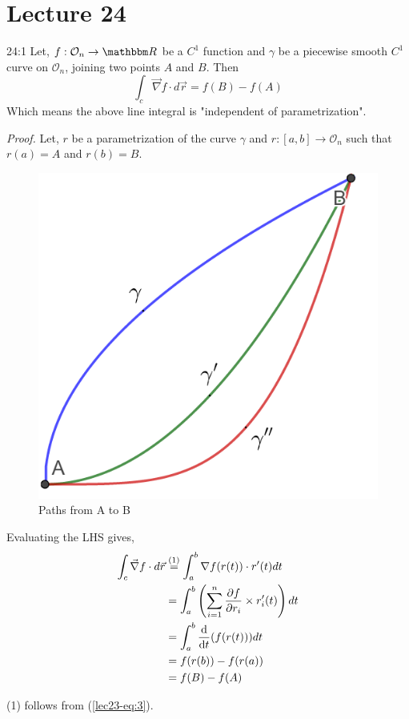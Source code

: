 \documentclass[../Analysis-3]{subfiles}
\begin{document}
\chapter*{Lecture 24} %
\setcounter{chapter}{24} %
\setcounter{section}{0}

\begin{Thm}{}{24:1}
    Let, $f: \mathcal{O}_n \to \R$ be a $C^1$ function and $\gamma$ be a piecewise smooth $C^1$ curve on $\mathcal{O}_n$, joining two points $A$ and $B$. Then
    \[\int_c \vec{\nabla}f\cdot d\vec{r} = f(B)-f(A)\]
    Which means the above line integral is "independent of parametrization".
\end{Thm}

\textit{Proof.} Let, $r$ be a parametrization of the curve $\gamma$ and $r :[a,b] \to \mathcal{O}_n$ such that $r(a)=A$ and $r(b)=B$.

\begin{figure}
    \centering
    \includegraphics[width=.78\linewidth]{../figures/lec-24.1.png}
    \caption{Paths from A to B}
\end{figure}

Evaluating the LHS gives,
\begin{align*}
    \int_c \vec{\nabla}f\cdot d\vec{r} & \overset{\mathrm{(1)}}{=} \int_a^b \nabla f(r(t)) \cdot r'(t) dt      \\
                                       & = \int_a^b \left(\sum_{i=1}^{n} \pdv{f}{r_i}\times r_i'(t) \right) dt \\
                                       & =\int_a^b \dv{t}(f(r(t))) dt                                          \\
                                       & = f(r(b)) - f(r(a))                                                   \\
                                       & = f(B) - f(A)
\end{align*}
\begin{center}
    (1) follows from (\ref{lec23-eq:3}).
\end{center}
\end{document}
